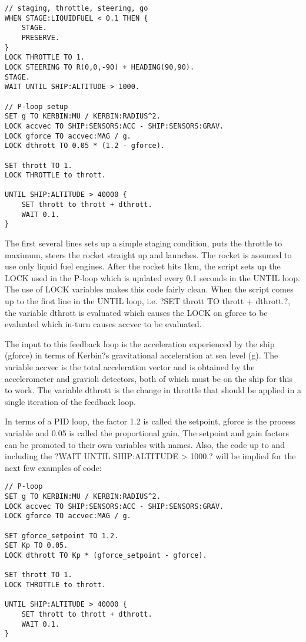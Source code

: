 \begin{Verbatim}[frame=single]
// staging, throttle, steering, go
WHEN STAGE:LIQUIDFUEL < 0.1 THEN {
    STAGE.
    PRESERVE.
}
LOCK THROTTLE TO 1.
LOCK STEERING TO R(0,0,-90) + HEADING(90,90).
STAGE.
WAIT UNTIL SHIP:ALTITUDE > 1000.

// P-loop setup
SET g TO KERBIN:MU / KERBIN:RADIUS^2.
LOCK accvec TO SHIP:SENSORS:ACC - SHIP:SENSORS:GRAV.
LOCK gforce TO accvec:MAG / g.
LOCK dthrott TO 0.05 * (1.2 - gforce).

SET thrott TO 1.
LOCK THROTTLE to thrott.

UNTIL SHIP:ALTITUDE > 40000 {
    SET thrott to thrott + dthrott.
    WAIT 0.1.
}
\end{Verbatim} 

The first several lines sets up a simple staging condition, puts the throttle to maximum, steers the rocket straight up and launches. The rocket is assumed to use only liquid fuel engines. After the rocket hits 1km, the script sets up the LOCK used in the P-loop which is updated every 0.1 seconds in the UNTIL loop. The use of LOCK variables makes this code fairly clean. When the script comes up to the first line in the UNTIL loop, i.e. ?SET thrott TO thrott + dthrott.?, the variable dthrott is evaluated which causes the LOCK on gforce to be evaluated which in-turn causes accvec to be evaluated.

The input to this feedback loop is the acceleration experienced by the ship (gforce) in terms of Kerbin?s gravitational acceleration at sea level (g). The variable accvec is the total acceleration vector and is obtained by the accelerometer and gravioli detectors, both of which must be on the ship for this to work. The variable dthrott is the change in throttle that should be applied in a single iteration of the feedback loop.

In terms of a PID loop, the factor 1.2 is called the setpoint, gforce is the process variable and 0.05 is called the proportional gain. The setpoint and gain factors can be promoted to their own variables with names. Also, the code up to and including the ?WAIT UNTIL SHIP:ALTITUDE > 1000.? will be implied for the next few examples of code:

\begin{Verbatim}[frame=single]
// P-loop
SET g TO KERBIN:MU / KERBIN:RADIUS^2.
LOCK accvec TO SHIP:SENSORS:ACC - SHIP:SENSORS:GRAV.
LOCK gforce TO accvec:MAG / g.

SET gforce_setpoint TO 1.2.
SET Kp TO 0.05.
LOCK dthrott TO Kp * (gforce_setpoint - gforce).

SET thrott TO 1.
LOCK THROTTLE to thrott.

UNTIL SHIP:ALTITUDE > 40000 {
    SET thrott to thrott + dthrott.
    WAIT 0.1.
}
\end{Verbatim} 

